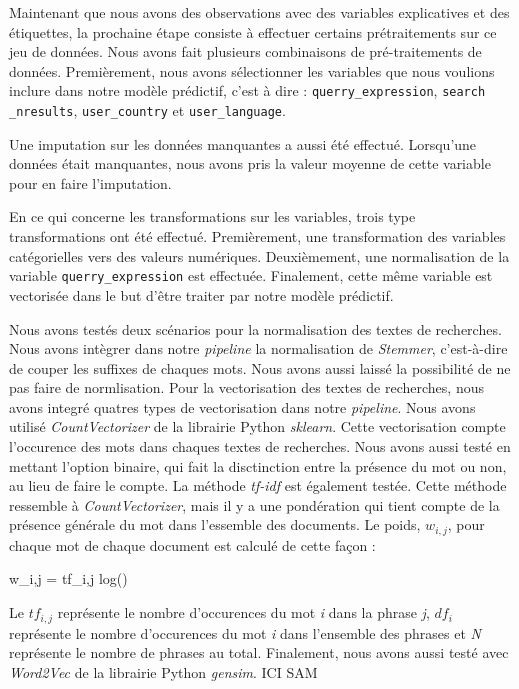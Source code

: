 Maintenant que nous avons des observations avec des variables explicatives et des étiquettes, la prochaine étape consiste à effectuer certains prétraitements sur ce jeu de données. Nous avons fait plusieurs combinaisons de pré-traitements de données. Premièrement, nous avons sélectionner les variables que nous voulions inclure dans notre modèle prédictif, c'est à dire : \texttt{querry\_expression}, \texttt{search \_nresults}, \texttt{user\_country} et \texttt{user\_language}.

Une imputation sur les données manquantes a aussi été effectué. Lorsqu'une données était manquantes, nous avons pris la valeur moyenne de cette variable pour en faire l'imputation.

En ce qui concerne les transformations sur les variables, trois type transformations ont été effectué. Premièrement, une transformation des variables catégorielles vers des valeurs numériques. Deuxièmement, une normalisation de la variable \texttt{querry\_expression} est effectuée. Finalement, cette même variable est vectorisée dans le but d'être traiter par notre modèle prédictif.

Nous avons testés deux scénarios pour la normalisation des textes de recherches. Nous avons intègrer dans notre \textit{pipeline} la normalisation de \textit{Stemmer}, c'est-à-dire de couper les suffixes de chaques mots. Nous avons aussi laissé la possibilité de ne pas faire de normlisation. Pour la vectorisation des textes de recherches, nous avons integré quatres types de vectorisation dans notre \textit{pipeline}. Nous avons utilisé \textit{CountVectorizer} de la librairie Python \textit{sklearn}. Cette vectorisation compte l'occurence des mots dans chaques textes de recherches. Nous avons aussi testé en mettant l'option binaire, qui fait la disctinction entre la présence du mot ou non, au lieu de faire le compte. La méthode \textit{tf-idf} est également testée. Cette méthode ressemble à \textit{CountVectorizer}, mais il y a une pondération qui tient compte de la présence générale du mot dans l'essemble des documents. Le poids, $w_{i,j}$, pour chaque mot  de chaque document est calculé de cette façon :

\begin{center}
  w_{i,j} = tf_{i,j} \times log()
\end{center}

Le $tf_{i,j}$ représente le nombre d'occurences du mot \textit{i} dans la phrase \textit{j}, $df_i$ représente le nombre d'occurences du mot \textit{i} dans l'ensemble des phrases et \textit{N} représente le nombre de phrases au total. 
Finalement, nous avons aussi testé avec \textit{Word2Vec} de la librairie Python \textit{gensim}. ICI SAM



